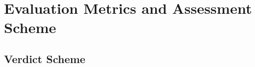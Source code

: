 \section{Evaluation Metrics and Assessment Scheme}
\label{sec:evaluation_metrics}
%

\subsection{Verdict Scheme}
\label{subsec:verdict_scheme}








